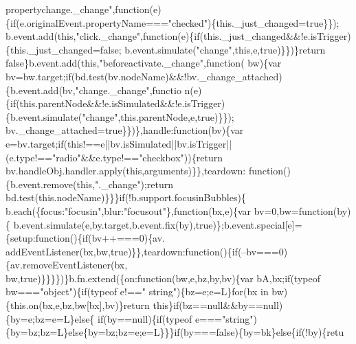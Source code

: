 \begin{DoxyCode}
{      propertychange.\_change"},\textcolor{keyword}{function}(e)\{\textcolor{keywordflow}{if}(e.originalEvent.propertyName===\textcolor{stringliteral}{"checked"})\{this.\_just\_changed=true\}\});
      b.event.add(\textcolor{keyword}{this},\textcolor{stringliteral}{"click.\_change"},\textcolor{keyword}{function}(e)\{\textcolor{keywordflow}{if}(this.\_just\_changed&&!e.isTrigger)\{this.\_just\_changed=false;
      b.event.simulate(\textcolor{stringliteral}{"change"},this,e,true)\}\})\}\textcolor{keywordflow}{return} \textcolor{keyword}{false}\}b.event.add(\textcolor{keyword}{this},\textcolor{stringliteral}{"beforeactivate.\_change"},\textcolor{keyword}{function}(
      bw)\{var bv=bw.target;if(bd.test(bv.nodeName)&&!bv.\_change\_attached)\{b.event.add(bv,\textcolor{stringliteral}{"change.\_change"},functio
      n(e)\{if(this.parentNode&&!e.isSimulated&&!e.isTrigger)\{b.event.simulate(\textcolor{stringliteral}{"change"},this.parentNode,e,true)\}\});
      bv.\_change\_attached=true\}\})\},handle:\textcolor{keyword}{function}(bv)\{var e=bv.target;\textcolor{keywordflow}{if}(\textcolor{keyword}{this}!==e||bv.isSimulated||bv.isTrigger||
      (e.type!==\textcolor{stringliteral}{"radio"}&&e.type!==\textcolor{stringliteral}{"checkbox"}))\{\textcolor{keywordflow}{return} bv.handleObj.handler.apply(\textcolor{keyword}{this},arguments)\}\},teardown:\textcolor{keyword}{
      function}()\{b.event.remove(\textcolor{keyword}{this},\textcolor{stringliteral}{".\_change"});\textcolor{keywordflow}{return} bd.test(this.nodeName)\}\}\}\textcolor{keywordflow}{if}(!b.support.focusinBubbles)\{
      b.each(\{focus:\textcolor{stringliteral}{"focusin"},blur:\textcolor{stringliteral}{"focusout"}\},\textcolor{keyword}{function}(bx,e)\{var bv=0,bw=\textcolor{keyword}{function}(by)\{
      b.event.simulate(e,by.target,b.event.fix(by),\textcolor{keyword}{true})\};b.event.special[e]=\{setup:\textcolor{keyword}{function}()\{\textcolor{keywordflow}{if}(bv++===0)\{av.
      addEventListener(bx,bw,\textcolor{keyword}{true})\}\},teardown:\textcolor{keyword}{function}()\{\textcolor{keywordflow}{if}(--bv===0)\{av.removeEventListener(bx,
      bw,\textcolor{keyword}{true})\}\}\}\})\}b.fn.extend(\{on:function(bw,e,bz,by,bv)\{var bA,bx;if(typeof bw===\textcolor{stringliteral}{"object"})\{if(typeof e!==\textcolor{stringliteral}{"
      string"})\{bz=e;e=L\}for(bx in bw)\{this.on(bx,e,bz,bw[bx],bv)\}return this\}if(bz==null&&by==null)\{by=e;bz=e=L\}else\{
      if(by==null)\{if(typeof e===\textcolor{stringliteral}{"string"})\{by=bz;bz=L\}else\{by=bz;bz=e;e=L\}\}\}if(by===false)\{by=bk\}else\{if(!by)\{retu

\end{DoxyCode}
